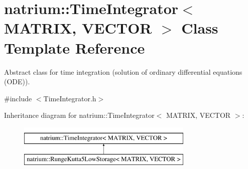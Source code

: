 \hypertarget{classnatrium_1_1TimeIntegrator}{\section{natrium\-:\-:Time\-Integrator$<$ M\-A\-T\-R\-I\-X, V\-E\-C\-T\-O\-R $>$ Class Template Reference}
\label{classnatrium_1_1TimeIntegrator}
}


Abstract class for time integration (solution of ordinary differential equations (O\-D\-E)).  




{\ttfamily \#include $<$Time\-Integrator.\-h$>$}

Inheritance diagram for natrium\-:\-:Time\-Integrator$<$ M\-A\-T\-R\-I\-X, V\-E\-C\-T\-O\-R $>$\-:\begin{figure}[H]
\begin{center}
\leavevmode
\includegraphics[height=2.000000cm]{classnatrium_1_1TimeIntegrator}
\end{center}
\end{figure}
